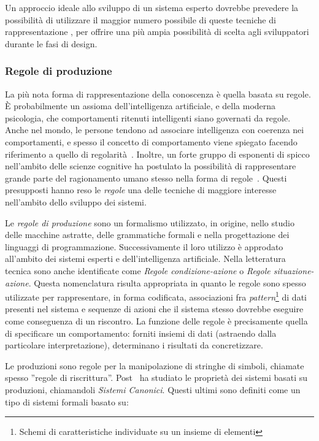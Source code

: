 Un approccio ideale allo sviluppo di un sistema esperto dovrebbe prevedere la possibilità di utilizzare il maggior numero possibile di queste tecniche di rappresentazione \cite{development1993}, per offrire una più ampia possibilità di scelta agli sviluppatori durante le fasi di design.

\subsubsection{Regole di produzione}
La più nota forma di rappresentazione della conoscenza è quella basata su regole. \`E probabilmente un assioma dell'intelligenza artificiale, e della moderna psicologia, che comportamenti ritenuti intelligenti siano governati da regole. Anche nel mondo, le persone tendono ad associare intelligenza con coerenza nei comportamenti, e spesso il concetto di comportamento viene spiegato facendo riferimento a quello di regolarità~\cite{jackson1999}.
Inoltre, un forte gruppo di esponenti di spicco nell'ambito delle scienze cognitive ha postulato la possibilità di rappresentare grande parte del ragionamento umano stesso nella forma di regole~\cite{anderson1993rules}.
Questi presupposti hanno reso le \emph{regole} una delle tecniche di maggiore interesse nell'ambito dello sviluppo dei sistemi.

Le \emph{regole di produzione} sono un formalismo utilizzato, in origine, nello studio delle macchine astratte, delle grammatiche formali e nella progettazione dei linguaggi di programmazione. Successivamente il loro utilizzo è approdato all'ambito dei sistemi esperti e dell'intelligenza artificiale. Nella letteratura tecnica sono anche identificate come \emph{Regole condizione-azione} o \emph{Regole situazione-azione}. Questa nomenclatura risulta appropriata in quanto le regole sono spesso utilizzate per rappresentare, in forma codificata, associazioni fra \emph{pattern}\footnote{Schemi di caratteristiche individuate su un insieme di elementi} di dati presenti nel sistema e sequenze di azioni che il sistema stesso dovrebbe eseguire come conseguenza di un riscontro. La funzione delle regole è precisamente quella di specificare un comportamento: forniti insiemi di dati (astraendo dalla particolare interpretazione), determinano i risultati da concretizzare.

Le produzioni sono regole per la manipolazione di stringhe di simboli, chiamate spesso ''regole di riscrittura''. Post~\cite{post1943} ha studiato le proprietà dei sistemi basati su produzioni, chiamandoli \emph{Sistemi Canonici}. Questi ultimi sono definiti come un tipo di sistemi formali basato su:

